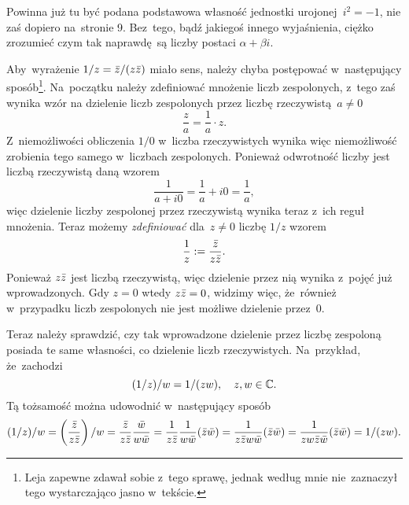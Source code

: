 \documentclass[a4paper,11pt]{article}
\begin{document}
\vspace{\spaceFour}



\start {} Powinna już tu być podana podstawowa własność jednostki
urojonej~$i^{ 2 } = -1$, nie zaś dopiero na~stronie 9. Bez~tego, bądź
jakiegoś innego wyjaśnienia, ciężko zrozumieć czym tak naprawdę~są
liczby postaci $\alpha + \beta i$.

\vspace{\spaceFour}



\start {} Aby~wyrażenie $1 / z = \bar{z} / ( z \bar{z} )$ miało
sens, należy chyba postępować w~następujący sposób\footnote{Leja
  zapewne zdawał sobie z~tego sprawę, jednak według mnie nie~zaznaczył
  tego wystarczająco jasno w~tekście.}. Na~początku należy zdefiniować
mnożenie liczb zespolonych, z~tego zaś wynika wzór na dzielenie liczb
zespolonych przez liczbę rzeczywistą~$a \neq 0$
\begin{equation}
  \label{eq:Leja-02}
    \frac{ z }{ a } = \frac{ 1 }{ a } \cdot z.
\end{equation}
Z~niemożliwości obliczenia $1 / 0$ w~liczba rzeczywistych wynika więc
niemożliwość zrobienia tego samego w~liczbach zespolonych. Ponieważ
odwrotność liczby jest liczbą rzeczywistą daną wzorem
\begin{equation}
  \label{eq:Leja-03}
  \frac{ 1 }{ a + i0 } = \frac{ 1 }{ a } + i0
  = \frac{ 1 }{ a },
\end{equation}
więc dzielenie liczby zespolonej przez rzeczywistą wynika teraz z~ich
reguł mnożenia. Teraz możemy \textit{zdefiniować} dla~$z \neq 0$ liczbę
$1 / z$ wzorem
\begin{equation}
  \label{eq:Leja-04}
    \frac{ 1 }{ z } := \frac{ \bar{z} }{ z \bar{z} }.
\end{equation}
Ponieważ $z \bar{z}$ jest liczbą rzeczywistą, więc dzielenie przez nią
wynika z~pojęć już wprowadzonych. Gdy $z = 0$ wtedy $z \bar{z} = 0$,
widzimy więc, że~również w~przypadku liczb zespolonych nie jest
możliwe dzielenie przez~0.

Teraz należy sprawdzić, czy tak wprowadzone dzielenie przez liczbę
zespoloną posiada te same własności, co dzielenie liczb rzeczywistych.
Na~przykład, że~zachodzi
\begin{equation}
  \label{eq:Leja-05}
    ( 1 / z ) / w = 1 / ( z w ), \quad z, w \in \mathbb{C}.
\end{equation}
Tą tożsamość można udowodnić w~następujący sposób
\begin{equation}
  \label{eq:Leja-06}
  \begin{split}
    ( 1 / z ) / w =
    \left( \frac{ \bar{z} }{ z \bar{z} } \right) / w
    = \frac{ \bar{z} }{ z \bar{z} } \frac{ \bar{w} }{ w \bar{w} }
    = \frac{ 1 }{ z \bar{z} } \frac{ 1 }{ w \bar{w} } ( \bar{z} \bar{w} )
    = \frac{ 1 }{ z \bar{z} w \bar{w} } ( \bar{z} \bar{w} )
    = \frac{ 1 }{ z w \bar{z} \bar{w} } ( \bar{z} \bar{w} )
    = 1 / ( z w ).
  \end{split}
\end{equation}
\end{document}

